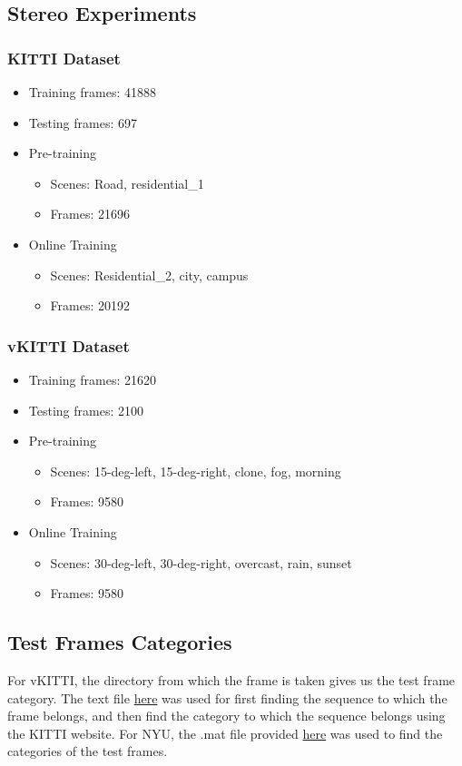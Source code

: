 \documentclass[lettersize,journal]{IEEEtran}
\begin{document}
 \subsection{Stereo Experiments}
 \subsubsection{KITTI Dataset}
 \begin{itemize} 
    \item Training frames: 41888
    \item Testing frames: 697
    \item Pre-training 
    \begin{itemize} 
       \item Scenes: Road, residential\_1
       \item Frames: 21696 
    \end{itemize} 
    \item Online Training
    \begin{itemize} 
       \item Scenes: Residential\_2, city, campus 
       \item Frames: 20192
    \end{itemize} 
 \end{itemize}
 
 \subsubsection{vKITTI Dataset}
 \begin{itemize} 
    \item Training frames: 21620
    \item Testing frames: 2100
    \item Pre-training 
    \begin{itemize} 
       \item Scenes: 15-deg-left, 15-deg-right, clone, fog, morning 
       \item Frames: 9580 
    \end{itemize} 
    \item Online Training
    \begin{itemize} 
       \item Scenes: 30-deg-left, 30-deg-right, overcast, rain, sunset  
       \item Frames: 9580
    \end{itemize} 
 \end{itemize}
 
 \subsection{Test Frames Categories}
 For vKITTI, the directory from which the frame is taken gives us the test frame category. The text file \href{https://github.com/nianticlabs/monodepth2/blob/master/splits/eigen/test\_files.txt}{here} was used for first finding the sequence to which the frame belongs, and then find the category to which the sequence belongs using the KITTI website. For NYU, the .mat file provided \href{http://horatio.cs.nyu.edu/mit/silberman/nyu\_depth\_v2/nyu\_depth\_v2\_labeled.mat}{here} was used to find the categories of the test frames.
 
\end{document}
